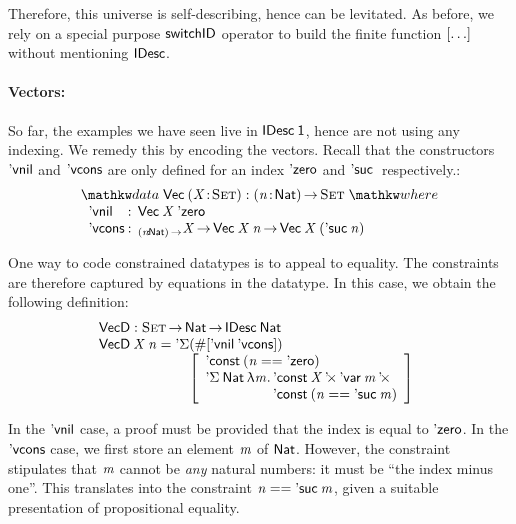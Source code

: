Therefore, this universe is self-describing, hence can be
levitated. As before, we rely on a special purpose $\F{switchID}$
operator to build the finite function $\bigRedBracket{\ldots}$
without mentioning \(\SYMBIDesc\).

\paragraph{Vectors:}

\newcommand{\VecD}{\F{VecD}}
\newcommand{\VecNil}{\etag{\CN{vnil}}}
\newcommand{\SYMBVecCons}{\etag{\CN{vcons}}\xspace}
\newcommand{\VecCons}[2]{\SYMBVecCons\:#1\:#2}

So far, the examples we have seen live in $\IDesc{\Unit}$, hence are
not using any indexing. We remedy this by encoding the vectors. Recall
that the constructors $\VecNil$ and $\SYMBVecCons$ are only defined for an
index $\NatZero$ and $\NatSuc$ respectively.:
%
\[
\stk{
\data \D{Vec}\: \PITEL{\V{X}}{\Set} : \PI{\V{n}}{\Nat} \Set \where \\
\;\;\begin{array}{@{}l@{\::\:\:}l@{\quad}l}
    \VecNil          & \D{Vec}\:\V{X}\:{\NatZero}   \\
    \SYMBVecCons & _{\PI{\V{n}}{\Nat}}\V{X} \To \D{Vec}\:{\V{X}}\:{\V{n}} \To \D{Vec}\:{\V{X}}\:{(\NatSuc{\V{n}})}
\end{array}
}
\]

One way to code constrained datatypes is to appeal to equality. The
constraints are therefore captured by equations in the datatype. In
this case, we obtain the following definition:
%
\[\stk{
\VecD : \Set \To \Nat \To \IDesc{\Nat} \\
\begin{array}{@{}l@{}l}
\VecD\: \V{X}\: \V{n} = \SYMBDSigma & (\EnumT{\sqr{ \VecNil\:\SYMBVecCons }}) \\
                        & \bigRedBracket{
                          \begin{array}{l}
                            \DConst{(\V{n} \PropEq \NatZero)} \\
                            \DSigma{\Nat}{\LAM{\V{m}}
\stk{\DProd{\DConst{\V{X}}}{\DProd{\DVar{\V{m}}}{\\\DConst{(\V{n} \PropEq \NatSuc{\V{m}})}}}}}
                          \end{array}
                          }
\end{array}
}\]

In the $\VecNil$ case, a proof must be provided that the index is
equal to $\NatZero$. In the $\SYMBVecCons$ case, we first store an element
$\V{m}$ of $\Nat$. However, the constraint stipulates that $\V{m}$
cannot be \emph{any} natural numbers: it must be ``the index minus
one''. This translates into the constraint $\V{n} \PropEq
\NatSuc{\V{m}}$, given a suitable presentation of propositional equality.


